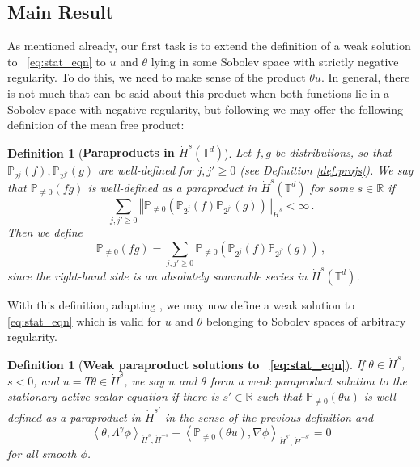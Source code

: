 \documentclass[12pt,reqno,letterpaper]{amsart}
\numberwithin{equation}{section}
\newcommand{\1}{{\bf 1}}
\newcommand{\2}{{\bf 2}}
\newcommand{\R}{\mathbb R}
\newcommand{\T}{\mathbb T}
\newtheorem{definition}[theorem]{Definition}
\theoremstyle{remark}
\theoremstyle{remark}
\begin{document}
\subsection{Main Result}

As mentioned already, our first task is to extend the definition of a weak solution to ~\eqref{eq:stat_eqn} to $u$ and $\theta$ lying in some Sobolev space with strictly negative regularity. To do this, we need to make sense of the product $\theta u$. In general, there is not much that can be said about this product when both functions lie in a Sobolev space with negative regularity, but following \cite[Definition 1.1]{ABGN} we may offer the following definition of the mean free product:

\begin{definition}[\textbf{Paraproducts in $\dot H^s(\T^d)$}]\label{def:paras}
    Let $f,g$ be distributions, so that $\mathbb{P}_{2^j}(f), \mathbb{P}_{2^{j'}}(g)$ are well-defined for $j,j'\geq 0$ (see Definition \ref{def:projs}).  We say that $\mathbb{P}_{\not = 0}(fg)$ is well-defined as a paraproduct in $\dot{H}^s(\T^d)$ for some $s \in \R$ if
    $$
        \sum_{j,j' \geq 0} \left\Vert \mathbb{P}_{\not = 0}\left(\mathbb{P}_{2^j}(f) \mathbb{P}_{2^{j'}}(g)\right) \right\Vert_{\dot{H}^s} < \infty \, .
    $$
    Then we define
    $$
        \mathbb{P}_{\not = 0}(fg) = \sum_{j,j' \geq 0} \mathbb{P}_{\not = 0} \left(\mathbb{P}_{2^j}(f) \mathbb{P}_{2^{j'}}(g)\right) \, ,
    $$
    since the right-hand side is an absolutely summable series in $\dot H^s(\T^d)$.
\end{definition}

With this definition, adapting \cite[Definition 1.2]{ABGN}, we may now define a weak solution to \eqref{eq:stat_eqn} which is valid for $u$ and $\theta$ belonging to Sobolev spaces of arbitrary regularity.

\begin{definition}[\textbf{Weak paraproduct solutions to ~\eqref{eq:stat_eqn}}] \label{def:weak_para_soln}
    If $\theta \in \dot{H}^s$, $s < 0$, and $u = T \theta \in \dot{H}^s$, we say $u$ and $\theta$ form a weak paraproduct solution to the stationary active scalar equation if there is $s' \in \R$ such that $\mathbb{P}_{\not = 0}(\theta u)$ is well defined as a paraproduct in $\dot{H}^{s'}$ in the sense of the previous definition and
    $$
        \left\langle \theta, \Lambda^{\gamma} \phi \right\rangle_{\dot{H}^{s},\dot{H}^{-s}} - \left\langle \mathbb{P}_{\not= 0}(\theta u), \nabla \phi \right\rangle_{\dot{H}^{s'}, \dot{H}^{-s'}} = 0
    $$
    for all smooth $\phi$.
\end{definition}
\end{document}
